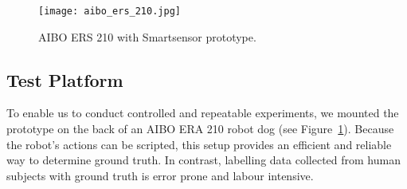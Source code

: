 \begin{figure}[t]
	\texttt{[image: aibo\_ers\_210.jpg]}
	\caption{AIBO ERS 210 with Smartsensor prototype.}
	\label{fig:aibo}
\end{figure}

\subsection{Test Platform}
\label{sec:testPlatform}

To enable us to conduct controlled and repeatable experiments, we
mounted the prototype on the back of an AIBO ERA 210 robot
dog (see Figure~\ref{fig:aibo}).  Because the robot's actions can be
scripted, this setup provides an efficient and reliable way to
determine ground truth.  In contrast, labelling data collected from
human subjects with ground truth is error prone and labour intensive.

